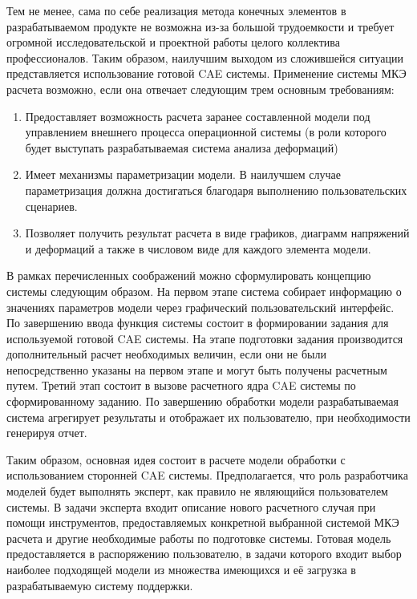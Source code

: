 \documentclass[14pt,oneside,final]{extreport}
\begin{document}
	Тем не менее, сама по себе реализация метода конечных элементов в разрабатываемом продукте не возможна из-за большой трудоемкости и требует огромной исследовательской и проектной работы целого коллектива профессионалов. Таким образом, наилучшим выходом из сложившейся ситуации представляется использование готовой CAE системы. Применение системы МКЭ расчета возможно, если она отвечает следующим трем основным требованиям:
	\begin{enumerate}
	\item Предоставляет возможность расчета заранее составленной модели под управлением внешнего процесса операционной системы (в роли которого будет выступать разрабатываемая система анализа деформаций)
	\item Имеет механизмы параметризации модели. В наилучшем случае параметризация должна достигаться благодаря выполнению пользовательских сценариев.
	\item Позволяет получить результат расчета в виде графиков, диаграмм напряжений и деформаций а также в числовом виде для каждого элемента модели.
	\end{enumerate}
		
	В рамках перечисленных соображений можно сформулировать концепцию системы следующим образом. На первом этапе система собирает информацию о значениях параметров модели через графический пользовательский интерфейс. По завершению ввода функция системы состоит в формировании задания для используемой готовой CAE системы. На этапе подготовки задания производится дополнительный расчет необходимых величин, если они не были непосредственно указаны на первом этапе и могут быть получены расчетным путем. Третий этап состоит в вызове расчетного ядра CAE системы по сформированному заданию. По завершению обработки модели разрабатываемая система агрегирует результаты и отображает их пользователю, при необходимости генерируя отчет.

	Таким образом, основная идея состоит в расчете модели обработки с использованием сторонней CAE системы. Предполагается, что роль разработчика моделей будет выполнять эксперт, как правило не являющийся пользователем системы. В задачи эксперта входит описание нового расчетного случая при помощи инструментов, предоставляемых конкретной выбранной системой МКЭ расчета и другие необходимые работы по подготовке системы. Готовая модель предоставляется в распоряжению пользователю, в задачи которого входит выбор наиболее подходящей модели из множества имеющихся и её загрузка в разрабатываемую систему поддержки.
\end{document}
